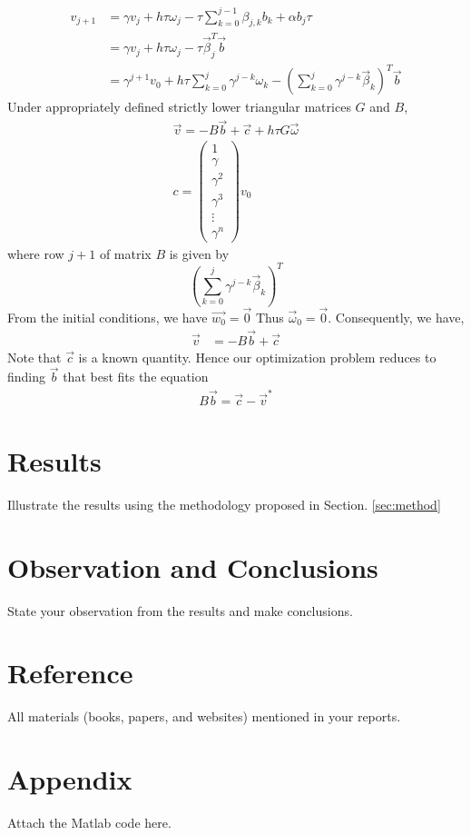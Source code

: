\documentclass{ifacconf}
\begin{document}
\begin{align} \label{eq:p0evolution}
v_{j+1} &= \gamma v_j + h\tau\omega_j - \tau\sum_{k=0}^{j-1}\beta_{j,k}b_k
	   + \alpha b_j\tau \\
	   &= \gamma v_j + h\tau\omega_j - \tau \vec{\beta}_j^T \vec{b}\\
	   &= \gamma^{j+1}v_0 
	   + h\tau\sum_{k=0}^{j} \gamma^{j-k}\omega_k
	   - \left(\sum_{k=0}^{j} \gamma^{j-k} \vec{\beta}_k\right)^T \vec{b}
\end{align}
Under appropriately defined strictly lower triangular matrices $G$ and $B$,
\begin{align}
	\vec{v} = - B\vec{b}+\vec{c} + h\tau G\vec{\omega}  \\
	c=\begin{pmatrix} 1 \\ \gamma \\  \gamma^2 \\ \gamma^3 \\ \vdots \\ \gamma^{n} \end{pmatrix}v_0
\end{align}
where row $j+1$ of matrix $B$ is given by
\[
\left(\sum_{k=0}^{j} \gamma^{j-k} \vec{\beta}_k\right)^T
\]
From the initial conditions, we have $\vec{w_0} = \vec{0}$ Thus $\vec{\omega}_0 =
\vec{0}$. Consequently, we have,
\begin{align}
	\vec{v} &= -B\vec{b} + \vec{c}
\end{align}
Note that $\vec{c}$ is a known quantity.
Hence our optimization problem reduces to finding $\vec{b}$ that best fits the equation
\begin{align}
	B\vec{b} = \vec{c}-\vec{v}^*
\end{align}

\section{Results}
Illustrate the results using the methodology proposed in Section. \ref{sec:method}

\section{Observation and Conclusions}
State your observation from the results and make conclusions. 

\section*{Reference}
All materials (books, papers, and websites) mentioned in your reports.   
\section*{Appendix}
Attach the Matlab code here.
\end{document}
